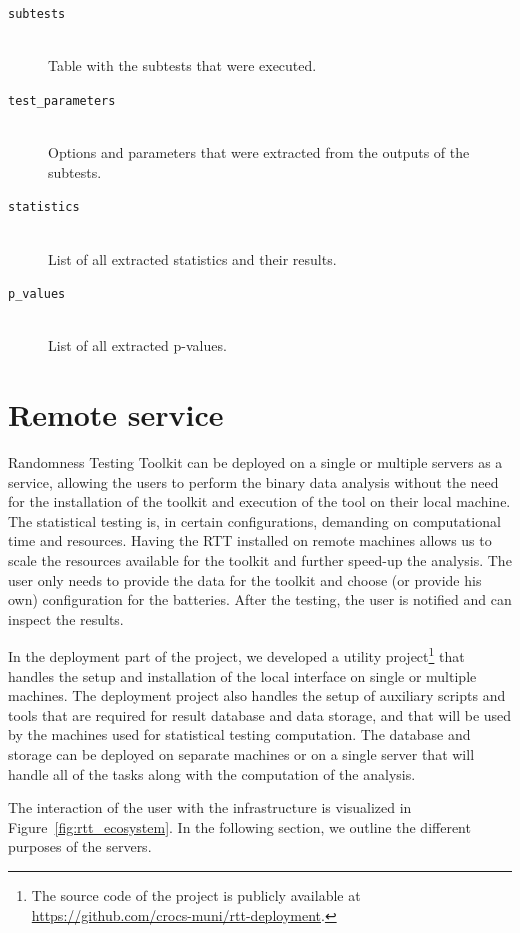 \documentclass[
	digital,    %
	oneside,    %
	color,
	11pt,
	nocover,
	notable,
	nolof,
	nolot,
]{fithesis3}
\theoremstyle{definition}
\theoremstyle{remark}
\begin{document}
\begin{description}
\item[\texttt{subtests}] \hfill \\
Table with the subtests that were executed.

\item[\texttt{test\_parameters}] \hfill \\
Options and parameters that were extracted from the outputs of the subtests.

\item[\texttt{statistics}] \hfill \\
List of all extracted statistics and their results.

\item[\texttt{p\_values}] \hfill \\
List of all extracted p-values.
\end{description}

\section{Remote service}
Randomness Testing Toolkit can be deployed on a single or multiple servers as a service, allowing the users to perform the binary data analysis without the need for the installation of the toolkit and execution of the tool on their local machine. The statistical testing is, in certain configurations, demanding on computational time and resources. Having the RTT installed on remote machines allows us to scale the resources available for the toolkit and further speed-up the analysis. The user only needs to provide the data for the toolkit and choose (or provide his own) configuration for the batteries. After the testing, the user is notified and can inspect the results.

In the deployment part of the project, we developed a utility project\footnote{The source code of the project is publicly available at \url{https://github.com/crocs-muni/rtt-deployment}.} that handles the setup and installation of the local interface on single or multiple machines. The deployment project also handles the setup of auxiliary scripts and tools that are required for result database and data storage, and that will be used by the machines used for statistical testing computation. The database and storage can be deployed on separate machines or on a single server that will handle all of the tasks along with the computation of the analysis. 

The interaction of the user with the infrastructure is visualized in Figure~\ref{fig:rtt_ecosystem}. In the following section, we outline the different purposes of the servers.
\end{document}
